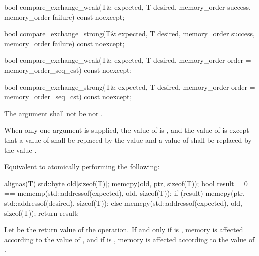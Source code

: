 \begin{itemdecl}
bool compare_exchange_weak(T& expected, T desired,
                           memory_order success, memory_order failure) const noexcept;

bool compare_exchange_strong(T& expected, T desired,
                             memory_order success, memory_order failure) const noexcept;

bool compare_exchange_weak(T& expected, T desired,
                           memory_order order = memory_order_seq_cst) const noexcept;

bool compare_exchange_strong(T& expected, T desired,
                             memory_order order = memory_order_seq_cst) const noexcept;
\end{itemdecl}

\begin{itemdescr}
\pnum
\removed{\requires}\added{\expects} The  argument shall not be
 nor .

\pnum
\effects
\begin{addedblock}
When only one  argument is supplied,
the value of  is , and
the value of  is 
except that a value of  shall be replaced by
the value  and
a value of  shall be replaced by
the value .
\end{addedblock}

\begin{addedblock}
Equivalent to atomically performing the following:
\begin{codeblock}
  alignas(T) std::byte old[sizeof(T)];
  memcpy(old, ptr, sizeof(T));
  bool result = 0 == memcmp(std::addressof(expected), old, sizeof(T));
  if (result) memcpy(ptr, std::addressof(desired), sizeof(T));
  else memcpy(std::addressof(expected), old, sizeof(T));
  return result;
\end{codeblock}

\pnum
Let  be the return value of the operation.
If and only if  is ,
memory is affected according to the value of , and
if  is ,
memory is affected according to the value of .
\end{addedblock}


\end{itemdescr}

